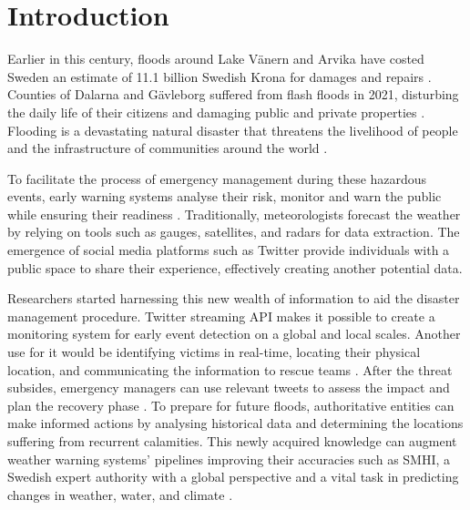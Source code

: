 \chapter{Introduction}\label{sec:introduction}

Earlier in this century, floods around Lake Vänern and Arvika have costed Sweden an estimate of 11.1
billion Swedish Krona for damages and repairs \cite{RiverFloodsSweden2022}. Counties of Dalarna and
Gävleborg suffered from flash floods in 2021, disturbing the daily life of their citizens and
damaging public and private properties \cite{daviesSwedenFlashFloods2021}. Flooding is a devastating
natural disaster that threatens the livelihood of people and the infrastructure of communities
around the world \cite{Floodlist2021}.

To facilitate the process of emergency management during these hazardous events, early warning
systems analyse their risk, monitor and warn the public while ensuring their readiness
\cite{contributorsEarlyWarningSystem2022}. Traditionally, meteorologists forecast the weather by
relying on tools such as gauges, satellites, and radars for data extraction. The emergence of social
media platforms such as Twitter provide individuals with a public space to share their experience,
effectively creating another potential data.

Researchers started harnessing this new wealth of information to aid the disaster management
procedure. Twitter streaming \ac{API} makes it possible to create a monitoring system for early
event detection on a global \cite{debruijnGlobalDatabaseHistoric2019b} and local
\cite{barkerDevelopmentNationalscaleRealtime2019} scales. Another use for it would be identifying
victims in real-time, locating their physical location, and communicating the information to rescue
teams \cite{singhEventClassificationLocation2019}. After the threat subsides, emergency managers can
use relevant tweets to assess the impact and plan the recovery phase
\cite{barkerDevelopmentNationalscaleRealtime2019}. To prepare for future floods, authoritative
entities can make informed actions by analysing historical data and determining the locations
suffering from recurrent calamities. This newly acquired knowledge can augment weather warning
systems' pipelines improving their accuracies such as \ac{SMHI}, a Swedish expert authority with a
global perspective and a vital task in predicting changes in weather, water, and climate
\cite{SMHI2021}.

